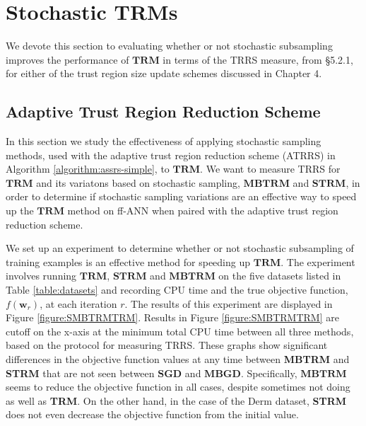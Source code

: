 \documentclass[letterpaper,12pt,titlepage,oneside,final]{book}
\begin{document}
	\section{Stochastic TRMs}
	
	We devote this section to evaluating whether or not stochastic subsampling improves the performance of $\mathbf{TRM}$ in terms of the TRRS measure, from \S{5.2.1}, for either of the trust region size update schemes discussed in Chapter 4.
	
	\subsection{Adaptive Trust Region Reduction Scheme}
	
	In this section we study the effectiveness of applying stochastic sampling methods, used with the adaptive trust region reduction scheme (ATRRS) in Algorithm \ref{algorithm:assrs-simple}, to $\mathbf{TRM}$. We want to measure TRRS for $\mathbf{TRM}$ and its variatons based on stochastic sampling, $\mathbf{MBTRM}$ and $\mathbf{STRM}$, in order to determine if stochastic sampling variations are an effective way to speed up the $\mathbf{TRM}$ method on ff-ANN when paired with the adaptive trust region reduction scheme. 

	We set up an experiment to determine whether or not stochastic subsampling of training examples is an effective method for speeding up $\mathbf{TRM}$. The experiment involves running $\mathbf{TRM}$, $\mathbf{STRM}$ and $\mathbf{MBTRM}$ on the five datasets listed in Table \ref{table:datasets} and recording CPU time and the true objective function, $f(\mathbf{w}_{r})$, at each iteration $r$. The results of this experiment are displayed in Figure \ref{figure:SMBTRMTRM}. Results in Figure \ref{figure:SMBTRMTRM} are cutoff on the x-axis at the minimum total CPU time between all three methods, based on the protocol for measuring TRRS. These graphs show significant differences in the objective function values at any time between \textbf{MBTRM} and \textbf{STRM} that are not seen between $\mathbf{SGD}$ and $\mathbf{MBGD}$. Specifically, $\mathbf{MBTRM}$ seems to reduce the objective function in all cases, despite sometimes not doing as well as \textbf{TRM}. On the other hand, in the case of the Derm dataset, \textbf{STRM} does not even decrease the objective function from the initial value. 
	
\end{document}
